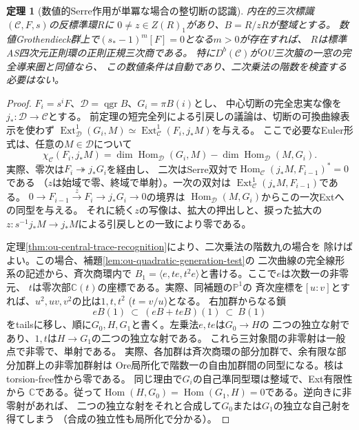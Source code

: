 \documentclass[11pt,a4paper]{ltjsarticle}
\newtheorem{theorem}{定理}[section]
\theoremstyle{definition}
\newcommand{\qgr}{\operatorname{qgr}}
\begin{document}
\begin{theorem}[数値的Serre作用が単冪な場合の整切断の認識]
\label{thm:ou-unipotent-integral-slice}
内在的三次標識$(\mathcal C,F,s)$の反標準環$R$に
$0\ne z\in Z(R)_1$があり、$B=R/zR$が整域とする。
数値Grothendieck群上で$(s_*-1)^m[F]=0$となる$m>0$が存在すれば、
$R$は標準AS四次元正則環の正則正規三次商である。
特に$D^b(\mathcal C)$がOU三次箙の一窓の完全導来圏と同値なら、
この数値条件は自動であり、二次乗法の階数を検査する必要はない。
\end{theorem}
\begin{proof}
$F_i=s^iF$、$\mathcal D=\qgr B$、$G_i=\pi B(i)$とし、
中心切断の完全忠実な像を$j_*:\mathcal D\to\mathcal C$とする。
前定理の短完全列による引戻しの議論は、切断の可換曲線表示を使わず
$\operatorname{Ext}^1_{\mathcal D}(G_i,M)\simeq
\operatorname{Ext}^1_{\mathcal C}(F_i,j_*M)$を与える。
ここで必要なEuler形式は、任意の$M\in\mathcal D$について
\[
 \chi_{\mathcal C}(F_i,j_*M)=
 \dim\operatorname{Hom}_{\mathcal D}(G_i,M)-
 \dim\operatorname{Hom}_{\mathcal D}(M,G_i).
 \tag{*}
\]
実際、零次は$F_i\twoheadrightarrow j_*G_i$を経由し、
二次はSerre双対で$\operatorname{Hom}_{\mathcal C}(j_*M,F_{i-1})^*=0$である
（$z$は始域で零、終域で単射）。一次の双対は
$\operatorname{Ext}^1_{\mathcal C}(j_*M,F_{i-1})$である。
$0\to F_{i-1}\xrightarrow{z}F_i\to j_*G_i\to0$の境界は
$\operatorname{Hom}_{\mathcal D}(M,G_i)$からこの一次Extへの同型を与える。
それに続く$z$の写像は、拡大の押出しと、捩った拡大の
$z:s^{-1}j_*M\to j_*M$による引戻しとの一致により零である。

定理\ref{thm:ou-central-trace-recognition}により、二次乗法の階数九の場合を
除けばよい。この場合、補題\ref{lem:ou-quadratic-generation-test}の
二次曲線の完全線形系の記述から、斉次商環内で
$B_1=\langle e,te,t^2e\rangle$と書ける。ここで$e$は次数一の非零元、
$t$は零次部$\mathbb C(t)$の座標である。実際、同補題の$\mathbb P^1$の
斉次座標を$[u:v]$とすれば、$u^2,uv,v^2$の比は$1,t,t^2$ ($t=v/u$)となる。
右加群からなる鎖
\[
 eB(1)\ \subset\ (eB+teB)(1)\ \subset\ B(1)
\]
をtailsに移し、順に$G_0,H,G_1$と書く。左乗法$e,te$は$G_0\to H$の
二つの独立な射であり、$1,t$は$H\to G_1$の二つの独立な射である。
これら三対象間の非零射は一般点で非零で、単射である。
実際、各加群は斉次商環の部分加群で、余有限な部分加群上の非零加群射は
Ore局所化で階数一の自由加群間の同型になる。核はtorsion-free性から零である。
同じ理由で$G_i$の自己準同型環は整域で、Ext有限性から
$\mathbb C$である。従って$\operatorname{Hom}(H,G_0)=
\operatorname{Hom}(G_1,H)=0$である。逆向きに非零射があれば、
二つの独立な射をそれと合成して$G_0$または$G_1$の独立な自己射を得てしまう
（合成の独立性も局所化で分かる）。


\end{proof}
\end{document}
